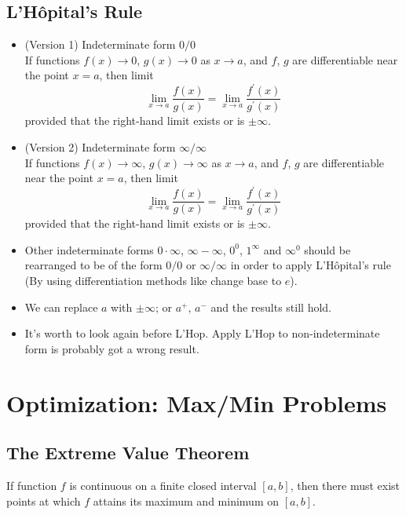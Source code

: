 \subsection{L'H\^opital's Rule}
\begin{itemize}
\item (Version 1) Indeterminate form $0/0$\\
  If functions $f(x)\to0$, $g(x)\to0$ as $x\to a$, and $f$, $g$ are differentiable near the point $x=a$, then limit
  \[\lim_{x\to a}\frac{f(x)}{g(x)}=\lim_{x\to a}\frac{f^\prime(x)}{g^\prime(x)}\]
  provided that the right-hand limit exists or is $\pm\infty$.
\item (Version 2) Indeterminate form $\infty/\infty$\\
  If functions $f(x)\to\infty$, $g(x)\to\infty$ as $x\to a$, and $f$, $g$ are differentiable near the point $x=a$, then limit
  \[\lim_{x\to a}\frac{f(x)}{g(x)}=\lim_{x\to a}\frac{f^\prime(x)}{g^\prime(x)}\]
  provided that the right-hand limit exists or is $\pm\infty$.
\item Other indeterminate forms $0\cdot\infty$, $\infty-\infty$, $0^0$, $1^\infty$ and $\infty^0$ should be rearranged to be of the form $0/0$ or $\infty/\infty$ in order to apply L'H\^opital's rule (By using differentiation methods like change base to $e$).
\end{itemize}
\begin{note}
  \begin{itemize}\leavevmode
  \item We can replace $a$ with $\pm\infty$; or $a^+$, $a^-$ and the results still hold.
  \item It's worth to look again before L'Hop. Apply L'Hop to non-indeterminate form is probably got a wrong result.
  \end{itemize}
\end{note}

\section{Optimization: Max/Min Problems}
\subsection{The Extreme Value Theorem}
If function $f$ is continuous on a finite closed interval $[a,b]$, then there must exist points at which $f$ attains its maximum and minimum on $[a,b]$.

